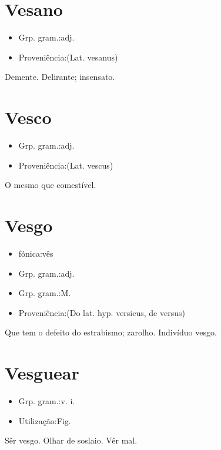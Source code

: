 \documentclass{article}
\begin{document}
\section{Vesano}
\begin{itemize}
\item {Grp. gram.:adj.}
\end{itemize}
\begin{itemize}
\item {Proveniência:(Lat. \textunderscore vesanus\textunderscore )}
\end{itemize}
Demente.
Delirante; insensato.
\section{Vesco}
\begin{itemize}
\item {Grp. gram.:adj.}
\end{itemize}
\begin{itemize}
\item {Proveniência:(Lat. \textunderscore vescus\textunderscore )}
\end{itemize}
O mesmo que \textunderscore comestível\textunderscore .
\section{Vesgo}
\begin{itemize}
\item {fónica:vês}
\end{itemize}
\begin{itemize}
\item {Grp. gram.:adj.}
\end{itemize}
\begin{itemize}
\item {Grp. gram.:M.}
\end{itemize}
\begin{itemize}
\item {Proveniência:(Do lat. hyp. \textunderscore versicus\textunderscore , de \textunderscore versus\textunderscore )}
\end{itemize}
Que tem o defeito do estrabismo; zarolho.
Indivíduo vesgo.
\section{Vesguear}
\begin{itemize}
\item {Grp. gram.:v. i.}
\end{itemize}
\begin{itemize}
\item {Utilização:Fig.}
\end{itemize}
Sêr vesgo.
Olhar de soslaio.
Vêr mal.
\end{document}

